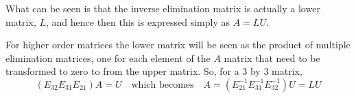             What can be seen is that the inverse elimination matrix is actually a lower matrix, \(L\), and hence 
            then this is expressed simply as \(A=LU\).
            \par \hfill \break
            For higher order matrices the lower matrix will be seen as the product of multiple elimination matrices, 
            one for each element of the \(A\) matrix that need to be transformed to zero to from the upper matrix. 
            So, for a 3 by 3 matrix,
            \begin{equation}
                (E_{32}E_{31}E_{21})A = U
                \quad \textrm{which becomes} \quad
                A = (E^{-1}_{21}E^{-1}_{31}E^{-1}_{32})U = LU
            \end{equation}